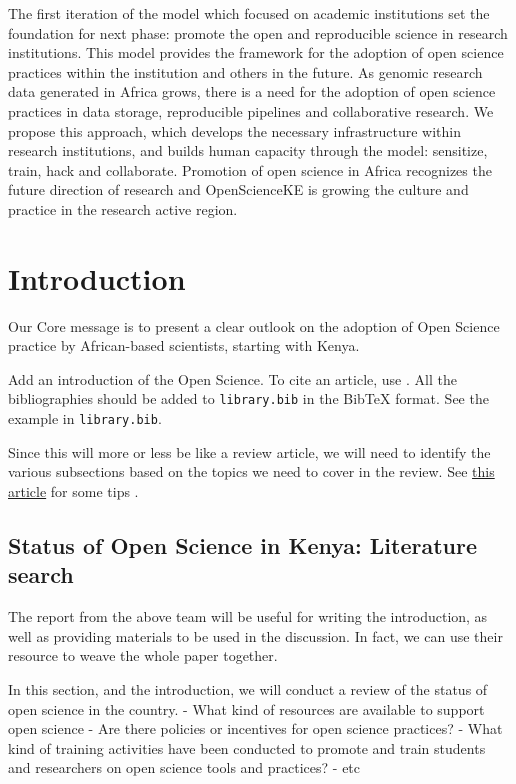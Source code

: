 The first iteration of the model which focused on academic institutions
set the foundation for next phase: promote the open and reproducible
science in research institutions. This model provides the framework for
the adoption of open science practices within the institution and others
in the future. As genomic research data generated in Africa grows, there
is a need for the adoption of open science practices in data storage,
reproducible pipelines and collaborative research. We propose this
approach, which develops the necessary infrastructure within research
institutions, and builds human capacity through the model: sensitize,
train, hack and collaborate. Promotion of open science in Africa
recognizes the future direction of research and OpenScienceKE is growing
the culture and practice in the research active region.

\section*{Introduction}\label{introduction}

Our Core message is to present a clear outlook on the adoption of Open
Science practice by African-based scientists, starting with Kenya.

Add an introduction of the Open Science. To cite an article, use
\cite{Schlegel2016}. All the bibliographies should be added to
\texttt{library.bib} in the BibTeX format. See the example in
\texttt{library.bib}.

Since this will more or less be like a review article, we will need to
identify the various subsections based on the topics we need to cover in
the review. See
\href{http://journals.plos.org/ploscompbiol/article?id=10.1371/journal.pcbi.1005619}{this
article} for some tips \cite{Mensh2017}.

\subsection*{Status of Open Science in Kenya: Literature
search}\label{status-of-open-science-in-kenya-literature-search}

The report from the above team will be useful for writing the
introduction, as well as providing materials to be used in the
discussion. In fact, we can use their resource to weave the whole paper
together.

In this section, and the introduction, we will conduct a review of the
status of open science in the country. - What kind of resources are
available to support open science - Are there policies or incentives for
open science practices? - What kind of training activities have been
conducted to promote and train students and researchers on open science
tools and practices? - etc

